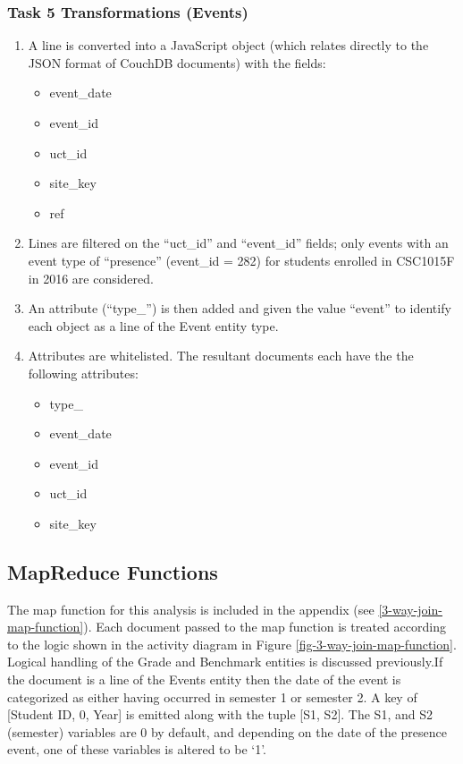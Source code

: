 \subsubsection{Task 5 Transformations (Events)}
\begin{enumerate}
    \item A line is converted into a JavaScript object (which relates directly to the JSON format of CouchDB documents) with the fields:
          \begin{itemize}
              \item event\_date
              \item event\_id
              \item uct\_id
              \item site\_key
              \item ref
          \end{itemize}
    \item Lines are filtered on the ``uct\_id'' and ``event\_id'' fields; only events with an event type of ``presence'' (event\_id = 282) for students enrolled in CSC1015F in 2016 are considered.
    \item An attribute (``type\_'') is then added and given the value ``event'' to identify each object as a line of the Event entity type.
    \item Attributes are whitelisted. The resultant documents each have the the following attributes:
          \begin{itemize}
              \item type\_
              \item event\_date
              \item event\_id
              \item uct\_id
              \item site\_key
          \end{itemize}
\end{enumerate}

\subsection{MapReduce Functions}
The map function for this analysis is included in the appendix (see \ref{3-way-join-map-function}). Each document passed to the map function is treated according to the logic shown in the activity diagram in Figure \ref{fig-3-way-join-map-function}. Logical handling of the Grade and Benchmark entities is discussed previously.If the document is a line of the Events entity then the date of the event is categorized as either having occurred in semester 1 or semester 2. A key of [Student ID, 0, Year] is emitted along with the tuple [S1, S2]. The S1, and S2 (semester) variables are 0 by default, and depending on the date of the presence event, one of these variables is altered to be `1'.

